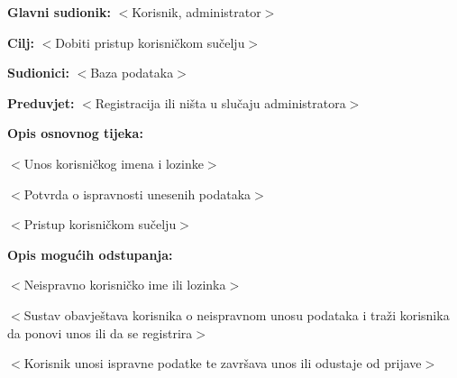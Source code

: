 					\noindent {}
					\begin{packed_item}
						
						\item \textbf{Glavni sudionik: }$<$Korisnik, administrator$>$
						\item  \textbf{Cilj:} $<$Dobiti pristup korisničkom sučelju$>$
						\item  \textbf{Sudionici:} $<$Baza podataka$>$
						\item  \textbf{Preduvjet:} $<$Registracija ili ništa u slučaju administratora$>$
						\item  \textbf{Opis osnovnog tijeka:}
						
						\item[] \begin{packed_enum}
							
							\item $<$Unos korisničkog imena i lozinke$>$
							\item $<$Potvrda o ispravnosti unesenih podataka$>$
							\item $<$Pristup korisničkom sučelju$>$

						\end{packed_enum}
						
						\item  \textbf{Opis mogućih odstupanja:}
						
						\item[] \begin{packed_item}
							
							\item[2.a] $<$Neispravno korisničko ime ili lozinka$>$
							\item[] \begin{packed_enum}

								\item $<$Sustav obavještava korisnika o neispravnom unosu podataka i traži korisnika da ponovi unos ili da se registrira$>$
								\item $<$Korisnik unosi ispravne podatke te završava unos ili odustaje od prijave$>$
								
							\end{packed_enum}
							
						\end{packed_item}
					\end{packed_item}
					
